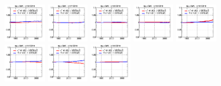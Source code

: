 \begin{figure}[!htbp]
{{\includegraphics[width=0.16\textwidth]{fig/spectra__pdf26_BB18_ADDGRW.png}
\includegraphics[width=0.16\textwidth]{fig/spectra__pdf27_BB18_ADDGRW.png}
\includegraphics[width=0.16\textwidth]{fig/spectra__pdf28_BB18_ADDGRW.png}
\includegraphics[width=0.16\textwidth]{fig/spectra__pdf29_BB18_ADDGRW.png}
\includegraphics[width=0.16\textwidth]{fig/spectra__pdf30_BB18_ADDGRW.png}\\
\includegraphics[width=0.16\textwidth]{fig/spectra__pdf31_BB18_ADDGRW.png}
\includegraphics[width=0.16\textwidth]{fig/spectra__pdf32_BB18_ADDGRW.png}
\includegraphics[width=0.16\textwidth]{fig/spectra__pdf33_BB18_ADDGRW.png}
}}
\end{figure}
